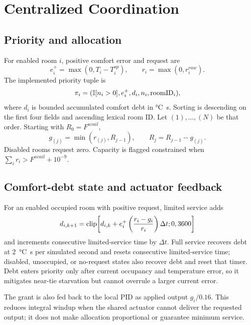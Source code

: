 \chapter{Centralized Coordination}
\label{ch:coordination}

\section{Priority and allocation}
For enabled room $i$, positive comfort error and request are
\begin{equation}e_i^+=\max(0,T_i-T_i^{sp}),\qquad r_i=\max(0,r_i^{raw}).\end{equation}
The implemented  priority tuple is
\begin{equation}
\pi_i=(\mathbb{I}[n_i>0],e_i^+,d_i,n_i,\mathrm{roomID}_i),
\end{equation}
where $d_i$ is bounded accumulated comfort debt in \si{\celsius\second}. Sorting is descending on the first four fields and ascending lexical room ID. Let $(1),\ldots,(N)$ be that order. Starting with $R_0=F^{avail}$,
\begin{equation}
g_{(j)}=\min(r_{(j)},R_{j-1}),\qquad R_j=R_{j-1}-g_{(j)}.
\label{eq:greedy}
\end{equation}
Disabled rooms request zero. Capacity is flagged constrained when $\sum_i r_i>F^{avail}+10^{-9}$.

\section{Comfort-debt state and actuator feedback}
For an enabled occupied room with positive request, limited service adds
\begin{equation}
d_{i,k+1}=\operatorname{clip}\!\left[d_{i,k}+e_i^+\left(\frac{r_i-g_i}{r_i}\right)\Delta t;0,3600\right]
\end{equation}
and increments consecutive limited-service time by $\Delta t$. Full service recovers debt at $2$~\si{\celsius\second} per simulated second and resets consecutive limited-service time; disabled, unoccupied, or no-request states also recover debt and reset that timer. Debt enters priority only after current occupancy and temperature error, so it mitigates near-tie starvation but cannot overrule a larger current error.

The grant is also fed back to the local PID as applied output $g_i/0.16$. This reduces integral windup when the shared actuator cannot deliver the requested output; it does not make allocation proportional or guarantee minimum service.

